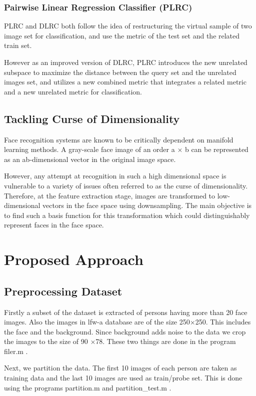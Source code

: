 \documentclass[a4paper]{article}
\begin{document}
		\subsubsection{Pairwise Linear Regression Classifier (PLRC)}
		PLRC and DLRC both follow the idea of
		restructuring the virtual sample of two image set for classification,
		and use the metric of the test set and the related
		train set.
		
		However as an improved
		version of DLRC, PLRC introduces the new unrelated
		subspace to maximize the distance between the query
		set and the unrelated images set, and utilizes a new combined
		metric that integrates a related metric and a new unrelated
		metric for classification.
		
		\subsection{Tackling Curse of Dimensionality}
			Face recognition systems are known to be critically dependent on
			manifold learning methods. A gray-scale face image of an order
			a ${\times}$ b can be represented as an ab-dimensional vector in the original
			image space. 
			
			However, any attempt at recognition in such a high dimensional
			space is vulnerable to a variety of issues often referred
			to as the curse of dimensionality. Therefore, at the feature extraction
			stage, images are transformed to low-dimensional vectors in the
			face space using downsampling. The main objective is to find such a basis function for this
			transformation which could distinguishably represent faces in the
			face space.
	
	\section{Proposed Approach}
	
		\subsection{Preprocessing Dataset}
					Firstly a subset of the dataset is extracted of persons having more than 20 face images.
			Also the images in lfw-a database are of the size 250${\times}$250. This includes the face and the background. Since background adds noise to the data we crop the images to the size of 90 ${\times}$78.
			These two things are done in the program filer.m .
			
			Next, we partition the data. The first 10 images of each person are taken as training data and the last 10 images are used as train/probe set. This is done using the programs partition.m and partition\_test.m .
\end{document}
